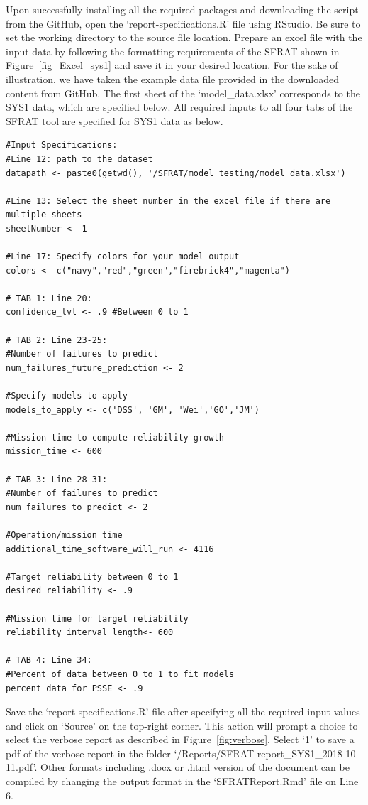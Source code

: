 \documentclass[conference]{IEEEtran}
\begin{document}
Upon successfully installing all the required packages and downloading the script from the GitHub, open the `report-specifications.R' file using RStudio. Be sure to set the working directory to the source file location. Prepare an excel file with the input data by following the formatting requirements of the SFRAT shown in Figure~\ref{fig_Excel_sys1} and save it in your desired location. For the sake of illustration, we have taken the example data file provided in the downloaded content from GitHub. The first sheet of the `model\_data.xlsx' corresponds to the SYS1 data, which are specified below. All required inputs to all four tabs of the SFRAT tool are specified for SYS1 data as below.
\begin{lstlisting}
#Input Specifications:
#Line 12: path to the dataset
datapath <- paste0(getwd(), '/SFRAT/model_testing/model_data.xlsx')   

#Line 13: Select the sheet number in the excel file if there are multiple sheets
sheetNumber <- 1  
       
#Line 17: Specify colors for your model output
colors <- c("navy","red","green","firebrick4","magenta") 

# TAB 1: Line 20: 
confidence_lvl <- .9 #Between 0 to 1

# TAB 2: Line 23-25:
#Number of failures to predict
num_failures_future_prediction <- 2 

#Specify models to apply
models_to_apply <- c('DSS', 'GM', 'Wei','GO','JM') 

#Mission time to compute reliability growth
mission_time <- 600

# TAB 3: Line 28-31:
#Number of failures to predict
num_failures_to_predict <- 2 

#Operation/mission time
additional_time_software_will_run <- 4116 

#Target reliability between 0 to 1
desired_reliability <- .9  

#Mission time for target reliability
reliability_interval_length<- 600 

# TAB 4: Line 34: 
#Percent of data between 0 to 1 to fit models
percent_data_for_PSSE <- .9 
\end{lstlisting}

Save the `report-specifications.R' file after specifying all the required input values and click on `Source' on the top-right corner. This action will prompt a choice to select the verbose report as described in Figure~\ref{fig:verbose}. Select `1' to save a pdf of the verbose report in the folder `/Reports/SFRAT report\_SYS1\_2018-10-11.pdf'. Other formats including .docx or .html version of the document can be compiled by changing the output format in the `SFRATReport.Rmd' file on Line 6.
\end{document}
